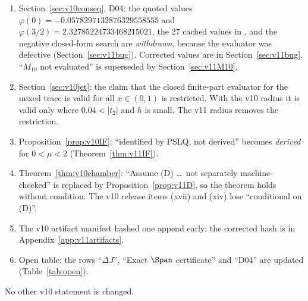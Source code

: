 \begin{enumerate}[label=(C\arabic*)]
\item Section~\ref{sec:v10conseq}, D04: the quoted values
\(\varphi(0)=-0.0578297132876329558555\) and
\(\varphi(3/2)=2.32785224733468215021\), the 27 cached values in
, and the negative closed-form search are
\emph{withdrawn}, because the evaluator was defective
(Section~\ref{sec:v11bug}). Corrected values are in
Section~\ref{sec:v11bug}. ``\(M_{10}\) not evaluated'' is superseded
by Section~\ref{sec:v11M10}.
\item Section~\ref{sec:v10jet}: the claim that the closed
finite-part evaluator for the mixed trace is valid for all
\(x\in(0,1)\) is restricted. With the v10 radius it is valid only
where \(0.04<|t_2|\) and \(h\) is small. The v11 radius removes the
restriction.
\item Proposition~\ref{prop:v10IF}: ``identified by PSLQ, not
derived'' becomes \emph{derived} for \(0<\mu<2\)
(Theorem~\ref{thm:v11IF}).
\item Theorem~\ref{thm:v10chamber}: ``Assume (D) \dots\ not separately
machine-checked'' is replaced by Proposition~\ref{prop:v11D}, so the
theorem holds without condition. The v10 release items (xvii) and
(xiv) lose ``conditional on (D)''.
\item The v10 artifact manifest hashed  one
append early; the corrected hash is in
Appendix~\ref{app:v11artifacts}.
\item Open table: the rows ``\(\Delta J\)'', ``Exact \(\Span\)
certificate'' and ``D04'' are updated (Table~\ref{tab:open}).
\end{enumerate}
No other v10 statement is changed.
